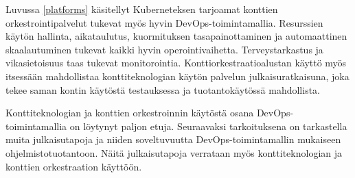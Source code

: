 Luvussa \ref{platforms} käsitellyt Kuberneteksen tarjoamat konttien orkestrointipalvelut tukevat myös hyvin DevOps-toimintamallia.
Resurssien käytön hallinta, aikataulutus, kuormituksen tasapainottaminen ja automaattinen skaalautuminen tukevat kaikki hyvin operointivaihetta.
Terveystarkastus ja vikasietoisuus taas tukevat monitorointia.
Konttiorkestraatioalustan käyttö myös itsessään mahdollistaa konttiteknologian käytön palvelun julkaisuratkaisuna, joka tekee saman kontin käytöstä testauksessa ja tuotantokäytössä mahdollista.

Konttiteknologian ja konttien orkestroinnin käytöstä osana DevOps-toimintamallia on löytynyt paljon etuja.
Seuraavaksi tarkoituksena on tarkastella muita julkaisutapoja ja niiden soveltuvuutta DevOps-toimintamallin mukaiseen ohjelmistotuotantoon.
Näitä julkaisutapoja verrataan myös konttiteknologian ja konttien orkestraation käyttöön.
